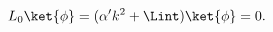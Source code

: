 \begin{equation}
%
L_{0} \ket{\phi} = (\alpha' k^2 + \Lint) \ket{\phi} = 0.
\label{eq:on_shell}
%
\end{equation}

